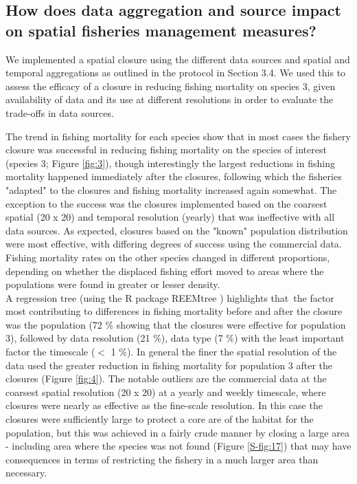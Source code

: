 \documentclass[review]{elsarticle}
\begin{document}
\subsection{How does data aggregation and source impact on spatial fisheries
	management measures?}

We implemented a spatial closure using the different data sources and spatial
and temporal aggregations as outlined in the protocol in Section 3.4. We used
this to assess the efficacy of a closure in reducing fishing mortality on
species 3, given availability of data and its use at different resolutions in
order to evaluate the trade-offs in data sources. 

The trend in fishing mortality for each species show that in most cases the
fishery closure was successful in reducing fishing mortality on the species of
interest (species 3; Figure \ref{fig:3}), though interestingly the largest
reductions in fishing mortality happened immediately after the closures,
following which the fisheries "adapted" to the closures and fishing mortality
increased again somewhat. The exception to the success was the closures
implemented based on the coarsest spatial (20 x 20) and temporal resolution
(yearly) that was ineffective with all data sources. As expected, closures
based on the "known" population distribution were most effective, with
differing degrees of success using the commercial data. Fishing mortality rates
on the other species changed in different proportions, depending on whether the
displaced fishing effort moved to areas where the populations were found in
greater or lesser density. \\

A regression tree (using the R package REEMtree \citep{Sela2012}) highlights
that the factor most contributing to differences in fishing mortality before
and after the closure was the population (72 \% showing that the closures were
effective for population 3), followed by data resolution (21 \%), data type (7
\%) with the least important factor the timescale ($<$ 1 \%). In general the
finer the spatial resolution of the data used the greater reduction in fishing
mortality for population 3 after the closures (Figure \ref{fig:4}). The notable
outliers are the commercial data at the coarsest spatial resolution (20 x 20)
at a yearly and weekly timescale, where closures were nearly as effective as
the fine-scale resolution. In this case the closures were sufficiently large to
protect a core are of the habitat for the population, but this was achieved in
a fairly crude manner by closing a large area - including area where the
species was not found (Figure \ref{S-fig:17}) that may have consequences in
terms of restricting the fishery in a much larger area than necessary. \\
\end{document}
